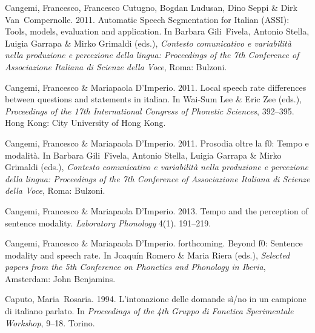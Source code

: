\documentclass[ number=1
,series=labphon
,output=long
,url=http://langsci-press.org/catalog/book/16
,isbn=978-3-944675-01-5
]{LSP/langsci}
\begin{document}
\begin{thebibliography}{284}
Cangemi, Francesco, Francesco Cutugno, Bogdan Ludusan, Dino Seppi \& Dirk
  Van~Compernolle. 2011.
\newblock Automatic {S}peech {S}egmentation for {I}talian ({ASSI}): {T}ools,
  models, evaluation and application.
\newblock In Barbara Gili~Fivela, Antonio Stella, Luigia Garrapa \& Mirko
  Grimaldi (eds.), \emph{Contesto comunicativo e variabilità nella produzione
  e percezione della lingua: {P}roceedings of the 7th {C}onference of
  {A}ssociazione {I}taliana di {S}cienze della {V}oce}, Roma: Bulzoni.

Cangemi, Francesco \& Mariapaola D'Imperio. 2011{}.
\newblock Local speech rate differences between questions and statements in
  italian.
\newblock In Wai-Sum Lee \& Eric Zee (eds.), \emph{Proceedings of the 17th
  {I}nternational {C}ongress of {P}honetic {S}ciences}, 392--395. Hong Kong:
  City University of Hong Kong.

Cangemi, Francesco \& Mariapaola D'Imperio. 2011{}.
\newblock Prosodia oltre la f0: {T}empo e modalità.
\newblock In Barbara Gili~Fivela, Antonio Stella, Luigia Garrapa \& Mirko
  Grimaldi (eds.), \emph{Contesto comunicativo e variabilità nella produzione
  e percezione della lingua: {P}roceedings of the 7th {C}onference of
  {A}ssociazione {I}taliana di {S}cienze della {V}oce}, Roma: Bulzoni.

Cangemi, Francesco \& Mariapaola D'Imperio. 2013.
\newblock Tempo and the perception of sentence modality.
\newblock \emph{Laboratory Phonology} 4(1). 191--219.

\enlargethispage{\baselineskip}
Cangemi, Francesco \& Mariapaola D'Imperio. forthcoming.
\newblock Beyond f0: {S}entence modality and speech rate.
\newblock In Joaquín Romero \& Maria Riera (eds.), \emph{Selected papers from
  the 5th {C}onference on {P}honetics and {P}honology in {I}beria}, Amsterdam:
  John Benjamins.

Caputo, Maria~Rosaria. 1994.
\newblock L'intonazione delle domande s{\`i}/no in un campione di italiano
  parlato.
\newblock In \emph{Proceedings of the 4th {Gruppo di Fonetica Sperimentale
  Workshop}}, 9--18. Torino.


\end{thebibliography}
\end{document}
